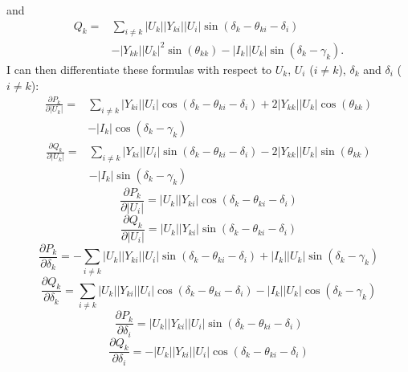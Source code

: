 and
\begin{equation}
	\begin{split}
		Q_k = 	& \sum_{i \ne k} |U_k| |Y_{ki}| |U_i| \sin \left( \delta_k - \theta_{ki} - \delta_i \right) \\
				& - |Y_{kk}| |U_k|^2 \sin \left( \theta_{kk} \right) - |I_k| |U_k| \sin \left( \delta_k - \gamma_k \right).
	\end{split}
\end{equation}
I can then differentiate these formulas with respect to $U_k$, $U_i$ ($i \ne k$), $\delta_k$ and $\delta_i$ ($i \ne k$):
\begin{equation}
	\begin{split}
		\frac{\partial P_k}{\partial |U_k|} = 
			& \sum_{i \ne k} |Y_{ki}| |U_i| \cos \left( \delta_k - \theta_{ki} - \delta_i \right) + 2 |Y_{kk}| |U_k| \cos \left( \theta_{kk} \right) \\
			& - |I_k| \cos \left( \delta_k - \gamma_k \right)
	\end{split}
	\label{eq:pk_magnitudek}
\end{equation}
\begin{equation}
	\begin{split}
		\frac{\partial Q_k}{\partial |U_k|} = 
			& \sum_{i \ne k} |Y_{ki}| |U_i| \sin \left( \delta_k - \theta_{ki} - \delta_i \right) - 2 |Y_{kk}| |U_k| \sin \left( \theta_{kk} \right) \\
			& - |I_k| \sin \left( \delta_k - \gamma_k \right)
	\end{split}
	\label{eq:qk_magnitudek}
\end{equation}
\begin{equation}
	\frac{\partial P_k}{\partial |U_i|} = |U_k| |Y_{ki}| \cos \left( \delta_k - \theta_{ki} - \delta_i \right)
	\label{eq:pk_magnitudei}
\end{equation}
\begin{equation}
	\frac{\partial Q_k}{\partial |U_i|} = |U_k| |Y_{ki}| \sin \left( \delta_k - \theta_{ki} - \delta_i \right)
	\label{eq:qk_magnitudei}
\end{equation}
\begin{equation}
	\frac{\partial P_k}{\partial \delta_k} = - \sum_{i \ne k} |U_k| |Y_{ki}| |U_i| \sin \left( \delta_k - \theta_{ki} - \delta_i \right) + |I_k| |U_k| \sin \left( \delta_k - \gamma_k \right)
	\label{eq:pk_phasek}
\end{equation}
\begin{equation}
	\frac{\partial Q_k}{\partial \delta_k} = \sum_{i \ne k} |U_k| |Y_{ki}| |U_i| \cos \left( \delta_k - \theta_{ki} - \delta_i \right) - |I_k| |U_k| \cos \left( \delta_k - \gamma_k \right)
	\label{eq:qk_phasek}
\end{equation}
\begin{equation}
	\frac{\partial P_k}{\partial \delta_i} = |U_k| |Y_{ki}| |U_i| \sin \left( \delta_k - \theta_{ki} - \delta_i \right)
	\label{eq:pk_phasei}
\end{equation}
\begin{equation}
	\frac{\partial Q_k}{\partial \delta_i} = - |U_k| |Y_{ki}| |U_i| \cos \left( \delta_k - \theta_{ki} - \delta_i \right)
	\label{eq:qk_phasei}
\end{equation}

